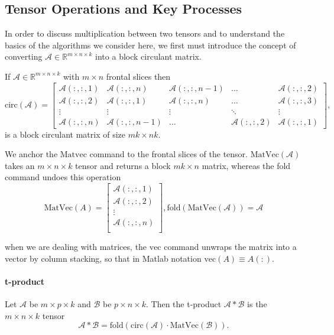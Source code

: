 \documentclass[format=acmsmall, review=false, screen=true]{acmart}
\begin{document}


\subsection{Tensor Operations and Key Processes}
In order to discuss multiplication between two tensors and to understand the basics of the algorithms we consider here, we first must introduce the concept of converting $\mathcal{A} \in \mathbb{R}^{m \times n \times k}$ into a block circulant matrix.

If $\mathcal{A} \in \mathbb{R}^{m \times n \times k}$ with $m \times n$ frontal slices then
$$
\text{circ}(\mathcal{A}) = 
    \begin{bmatrix}
    \mathcal{A}(:,:,1) & \mathcal{A}(:,:,n) & \mathcal{A}(:,:,n-1) & \ldots & \mathcal{A}(:,:,2) \\
    \mathcal{A}(:,:,2) & \mathcal{A}(:,:,1) & \mathcal{A}(:,:,n) & \ldots & \mathcal{A}(:,:,3) \\
    \vdots & \vdots & \vdots & \ddots & \vdots \\
    \mathcal{A}(:,:,n) & \mathcal{A}(:,:,n-1) & \ldots & \mathcal{A}(:,:,2) & \mathcal{A}(:,:,1)
    \end{bmatrix} ,
$$
is a block circulant matrix of size $mk \times nk$.

We anchor the $\text{Matvec}$ command to the frontal slices of the tensor.
$\text{MatVec}(\mathcal{A})$ takes an $m \times n \times k$ tensor and returns a block $mk \times n$ matrix, whereas the fold command undoes this operation
$$
    \text{MatVec}(A)= 
    \begin{bmatrix}
    \mathcal{A}(:,:,1) \\
    \mathcal{A}(:,:,2) \\
    \vdots \\
    \mathcal{A}(:,:,n)\\
    \end{bmatrix}
    ,  \text{fold}(\text{MatVec}(\mathcal{A})) = \mathcal{A}
$$


when we are dealing with matrices, the $\text{vec}$ command unwraps the matrix
into a vector by column stacking, so that in Matlab notation $\text{vec}(A) \equiv A(:)$.

\paragraph{t-product} Let $\mathcal{A}$ be $m \times p \times k$ and $\mathcal{B}$ be $p \times n \times k$. Then the t-product $\mathcal{A} \ast \mathcal{B}$ is the $m \times n \times k$ tensor 
\begin{equation}
    \mathcal{A} \ast \mathcal{B} = \text{fold}(\text{circ}(\mathcal{A}) \cdot
    \text{MatVec}(\mathcal{B})).
\end{equation}
\end{document}

